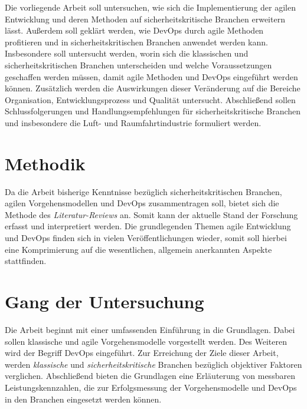 Die vorliegende Arbeit soll untersuchen, wie sich die Implementierung der agilen Entwicklung und deren Methoden auf sicherheitskritische Branchen erweitern lässt.
Außerdem soll geklärt werden, wie DevOps durch agile Methoden profitieren und in sicherheitskritischen Branchen anwendet werden kann.
Insbesondere soll untersucht werden, worin sich die klassischen und sicherheitskritischen Branchen unterscheiden und welche Voraussetzungen geschaffen werden müssen, damit agile Methoden und DevOps eingeführt werden können.
Zusätzlich werden die Auswirkungen dieser Veränderung auf die Bereiche Organisation, Entwicklungsprozess und Qualität untersucht.
Abschließend sollen Schlussfolgerungen und Handlungsempfehlungen für sicherheitskritische Branchen und insbesondere die Luft- und Raumfahrtindustrie formuliert werden.


\section{Methodik}

Da die Arbeit bisherige Kenntnisse bezüglich sicherheitskritischen Branchen, agilen Vorgehensmodellen und DevOps zusammentragen soll, bietet sich die Methode des \emph{Literatur-Reviews} \parencite[vgl.][]{Fettke:2006aa} an.
Somit kann der aktuelle Stand der Forschung erfasst und interpretiert werden.
Die grundlegenden Themen agile Entwicklung und DevOps finden sich in vielen Veröffentlichungen wieder, somit soll hierbei eine Komprimierung auf die wesentlichen, allgemein anerkannten Aspekte stattfinden.

\section{Gang der Untersuchung}

Die Arbeit beginnt mit einer umfassenden Einführung in die Grundlagen.
Dabei sollen klassische und agile Vorgehensmodelle vorgestellt werden.
Des Weiteren wird der Begriff DevOps eingeführt.
Zur Erreichung der Ziele dieser Arbeit, werden \emph{klassische} und \emph{sicherheitskritische} Branchen bezüglich objektiver Faktoren verglichen.
Abschließend bieten die Grundlagen eine Erläuterung von messbaren Leistungskennzahlen, die zur Erfolgsmessung der Vorgehensmodelle und DevOps in den Branchen eingesetzt werden können.

